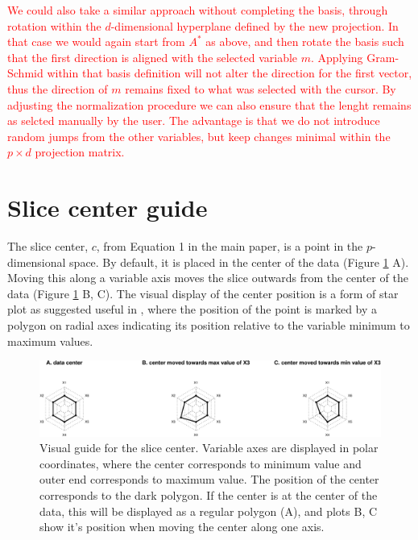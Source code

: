 \documentclass[]{interact}
\theoremstyle{plain}%
\theoremstyle{definition}
\theoremstyle{remark}
\begin{document}
\textcolor{red}{We could also take a similar approach without completing the basis, through rotation within the $d$-dimensional hyperplane defined by the new projection. In that case we would again start from $A^*$ as above, and then rotate the basis such that the first direction is aligned with the selected variable $m$. Applying Gram-Schmid within that basis definition will not alter the direction for the first vector, thus the direction of $m$ remains fixed to what was selected with the cursor. By adjusting the normalization procedure we can also ensure that the lenght remains as selcted manually by the user. The advantage is that we do not introduce random jumps from the other variables, but keep changes minimal within the $p\times d$ projection matrix.}

\hypertarget{slice-center-guide}{%
\section{Slice center guide}\label{slice-center-guide}}

The slice center, \(c\), from Equation 1 in the main paper, is a point
in the \(p\)-dimensional space. By default, it is placed in the center
of the data (Figure \ref{fig:anchornav} A). Moving this along a variable
axis moves the slice outwards from the center of the data (Figure
\ref{fig:anchornav} B, C). The visual display of the center position is
a form of star plot as suggested useful in \citet{condviz2}, where the
position of the point is marked by a polygon on radial axes indicating
its position relative to the variable minimum to maximum values.

\begin{figure}
\includegraphics[width=1\linewidth]{appendix_files/figure-latex/anchornav-1} \caption{Visual guide for the slice center. Variable axes are displayed in polar coordinates, where the center corresponds to minimum value and outer end corresponds to maximum value. The position of the center corresponds to the dark polygon. If the center is at the center of the data, this will be displayed as a regular polygon (A), and plots B, C show it's position when moving the center along one axis.}\label{fig:anchornav}
\end{figure}
\end{document}
